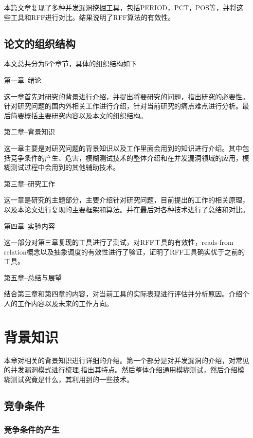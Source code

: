 本篇文章复现了多种并发漏洞挖掘工具，包括PERIOD，PCT，POS等，并将这些工具和RFF进行对比。结果说明了RFF算法的有效性。

\subsection{论文的组织结构}

本文总共分为5个章节，具体的组织结构如下

第一章--绪论\par
这一章首先对研究的背景进行介绍，并提出将要研究的问题，指出研究的必要性。针对研究问题的国内外相关工作进行介绍，针对当前研究的痛点难点进行分析。最后简要概括主要研究内容以及本文的组织结构。\par\par
第二章--背景知识\par
这一章主要是对研究问题的背景知识以及工作里面会用到的知识进行介绍。其中包括竞争条件的产生、危害，模糊测试技术的整体介绍和在并发漏洞领域的应用，模糊测试过程中会用到的其他辅助技术。\par\par
第三章--研究工作\par
这一章是研究的主题部分，主要介绍针对研究问题，目前提出的工作的相关原理，以及本论文进行复现的主要框架和算法。并在最后对各种技术进行了总结和对比。\par\par
第四章--实验内容\par
这一部分对第三章复现的工具进行了测试，对RFF工具的有效性，reads-from relation概念以及抽象调度的有效性进行了验证，证明了RFF工具确实优于之前的工具。\par\par
第五章--总结与展望\par
结合第三章和第四章的内容，对当前工具的实际表现进行评估并分析原因。介绍个人的工作内容以及未来的工作方向。

\section{背景知识}

本章对相关的背景知识进行详细的介绍。第一个部分是对并发漏洞的介绍，对常见的并发漏洞模式进行梳理,指出其特点。然后整体介绍通用模糊测试，然后介绍模糊测试究竟是什么，其利用到的一些技术。

\subsection{竞争条件}

\subsubsection{竞争条件的产生}

